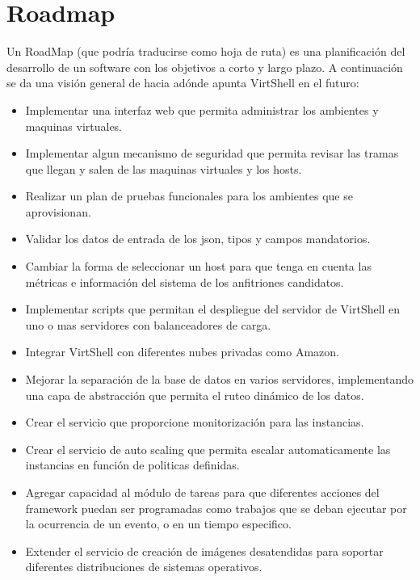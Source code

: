 
\chapter{Roadmap}
\label{roadmap}

Un RoadMap (que podría traducirse como hoja de ruta) es una planificación del desarrollo de un software con los objetivos a corto y largo plazo. A continuación se da una visión general de hacia adónde apunta VirtShell en el futuro:

\begin{itemize}
\item Implementar una interfaz web que permita administrar los ambientes y maquinas virtuales.
\item Implementar algun mecanismo de seguridad que permita revisar las tramas que llegan y salen de las maquinas virtuales y los hosts.
\item Realizar un plan de pruebas funcionales para los ambientes que se aprovisionan.
\item Validar los datos de entrada de los json, tipos y campos mandatorios.
\item Cambiar la forma de seleccionar un host para que tenga en cuenta las métricas e información del sistema de los anfitriones candidatos.
\item Implementar scripts que permitan el despliegue del servidor de VirtShell en uno o mas servidores con balanceadores de carga.
\item Integrar VirtShell con diferentes nubes privadas como Amazon.
\item Mejorar la separación de la base de datos en varios servidores, implementando una capa de abstracción que permita el ruteo dinámico de los datos.
\item Crear el servicio que proporcione monitorización para las instancias.
\item Crear el servicio de auto scaling que permita escalar automaticamente las instancias en función de politicas definidas.
\item Agregar capacidad al módulo de tareas para que diferentes acciones del framework puedan ser programadas como trabajos que se deban ejecutar por la ocurrencia de un evento, o en un tiempo especifico. 
\item Extender el servicio de creación de imágenes desatendidas para soportar diferentes distribuciones de sistemas operativos.
\end{itemize}
        